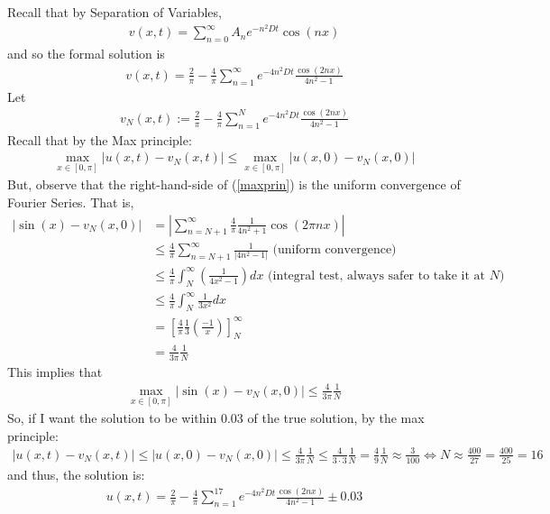 \documentclass[11pt]{scrartcl}
\theoremstyle{definition}
\theoremstyle{remark}
\newcommand{\idx}[2]{\int_{#1}^{#2}}
\begin{document}
	Recall that by Separation of Variables, 
	\begin{align*}
		v(x,t) = \sum_{n=0}^\infty A_n e^{-n^2 Dt} \cos (nx)
	\end{align*}
	and so the formal solution is
	\begin{align*}
		v(x,t) = \frac{2}{\pi} - \frac{4}{\pi} \sum_{n=1}^\infty e^{-4n^2 Dt} \frac{\cos(2nx)}{4n^2-1}
	\end{align*}
	Let 
	\begin{align*}
		v_N(x,t) := \frac{2}{\pi} - \frac{4}{\pi} \sum_{n=1}^N e^{-4n^2 Dt} \frac{\cos(2nx)}{4n^2-1}
	\end{align*}
	Recall that by the Max principle:
	\begin{align}\label{maxprin}
	\max_{x \in [0,\pi]} |u(x,t) - v_N(x,t)| \leq \max_{x \in [0,\pi]} |u(x,0) - v_N(x,0)|	
	\end{align}
	But, observe that the right-hand-side of (\ref{maxprin}) is the uniform convergence of Fourier Series. That is, 
	\begin{align*}
		| \sin(x) - v_N(x,0)| & = \left| \sum_{n=N+1}^\infty \frac{4}{\pi} \frac{1}{4n^2 +1} \cos (2 \pi n x)  \right| \\
		& \leq \frac{4}{\pi} \sum_{n=N+1}^\infty \frac{1}{|4n^2-1|} \text{ (uniform convergence)} \\
		& \leq \frac{4}{\pi} \idx{N}{\infty} \left( \frac{1}{4x^2-1} \right) dx \text{ (integral test, always safer to take it at $N$)} \\
		& \leq \frac{4}{\pi} \idx{N}{\infty} \frac{1}{3x^2} dx \\
		& = \left[ \frac{4}{\pi} \frac{1}{3} \left( \frac{-1}{x} \right) \right]_{N}^\infty \\
		& = \frac{4}{3\pi} \frac{1}{N}
	\end{align*}
	This implies that
	\begin{align*}
		\max_{x \in [0,\pi]} | \sin(x) - v_N(x,0)| \leq \frac{4}{3\pi} \frac{1}{N}
	\end{align*}
	So, if I want the solution to be within $0.03$ of the true solution, by the max principle: 
	\begin{align*}
		|u(x,t) - v_N(x,t)| \leq |u(x,0) - v_N(x,0)| \leq \frac{4}{3 \pi} \frac{1}{N} \leq \frac{4}{3 \cdot 3} \frac{1}{N} = \frac{4}{9} \frac{1}{N} \approx \frac{3}{100} \iff N \approx \frac{400}{27} = \frac{400}{25} = 16
	\end{align*}
	and thus, the solution is:
	\begin{align}
	u(x,t) = \frac{2}{\pi} - \frac{4}{\pi} \sum_{n=1}^{17} e^{-4n^2Dt} \frac{\cos(2n x)}{4n^2 -1} \pm 0.03	
	\end{align}
	
\end{document}
